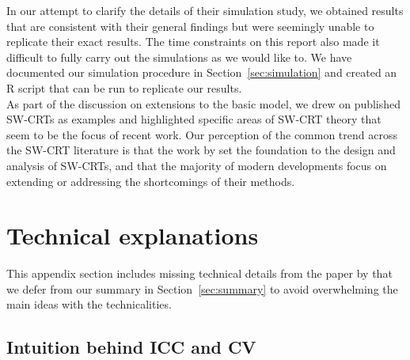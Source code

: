 \documentclass[10pt]{article}
\begin{document}
In our attempt to clarify the details of their simulation study, we obtained results that are consistent with their general findings but were seemingly unable to replicate their exact results. The time constraints on this report also made it difficult to fully carry out the simulations as we would like to. We have documented our simulation procedure in Section~\ref{sec:simulation} and created an R script that can be run to replicate our results.
\\

As part of the discussion on extensions to the basic model, we drew on published SW-CRTs as examples and highlighted specific areas of SW-CRT theory that seem to be the focus of recent work. Our perception of the common trend across the SW-CRT literature is that the work by \citeauthor{Hussey:2007} set the foundation to the design and analysis of SW-CRTs, and that the majority of modern developments focus on extending or addressing the shortcomings of their methods.


\newpage


\printbibliography


\newpage


\appendix

\section{Technical explanations} \label{apx}

This appendix section includes missing technical details from the paper by \textcite{Hussey:2007} that we defer from our summary in Section~\ref{sec:summary} to avoid overwhelming the main ideas with the technicalities.

\subsection{Intuition behind ICC and CV} \label{apx:correlation}
\end{document}
